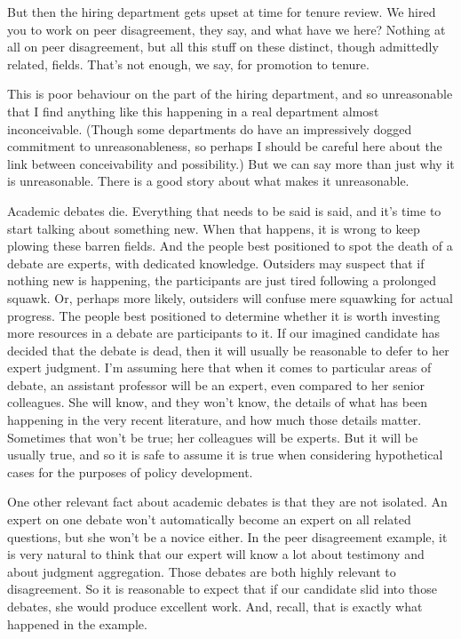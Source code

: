 \documentclass[
  11pt,
  letterpaper,
  DIV=11,
  numbers=noendperiod]{scrartcl}
\begin{document}
But then the hiring department gets upset at time for tenure review. We
hired you to work on peer disagreement, they say, and what have we here?
Nothing at all on peer disagreement, but all this stuff on these
distinct, though admittedly related, fields. That's not enough, we say,
for promotion to tenure.

This is poor behaviour on the part of the hiring department, and so
unreasonable that I find anything like this happening in a real
department almost inconceivable. (Though some departments do have an
impressively dogged commitment to unreasonableness, so perhaps I should
be careful here about the link between conceivability and possibility.)
But we can say more than just why it is unreasonable. There is a good
story about what makes it unreasonable.

Academic debates die. Everything that needs to be said is said, and it's
time to start talking about something new. When that happens, it is
wrong to keep plowing these barren fields. And the people best
positioned to spot the death of a debate are experts, with dedicated
knowledge. Outsiders may suspect that if nothing new is happening, the
participants are just tired following a prolonged squawk. Or, perhaps
more likely, outsiders will confuse mere squawking for actual progress.
The people best positioned to determine whether it is worth investing
more resources in a debate are participants to it. If our imagined
candidate has decided that the debate is dead, then it will usually be
reasonable to defer to her expert judgment. I'm assuming here that when
it comes to particular areas of debate, an assistant professor will be
an expert, even compared to her senior colleagues. She will know, and
they won't know, the details of what has been happening in the very
recent literature, and how much those details matter. Sometimes that
won't be true; her colleagues will be experts. But it will be usually
true, and so it is safe to assume it is true when considering
hypothetical cases for the purposes of policy development.

One other relevant fact about academic debates is that they are not
isolated. An expert on one debate won't automatically become an expert
on all related questions, but she won't be a novice either. In the peer
disagreement example, it is very natural to think that our expert will
know a lot about testimony and about judgment aggregation. Those debates
are both highly relevant to disagreement. So it is reasonable to expect
that if our candidate slid into those debates, she would produce
excellent work. And, recall, that is exactly what happened in the
example.
\end{document}
